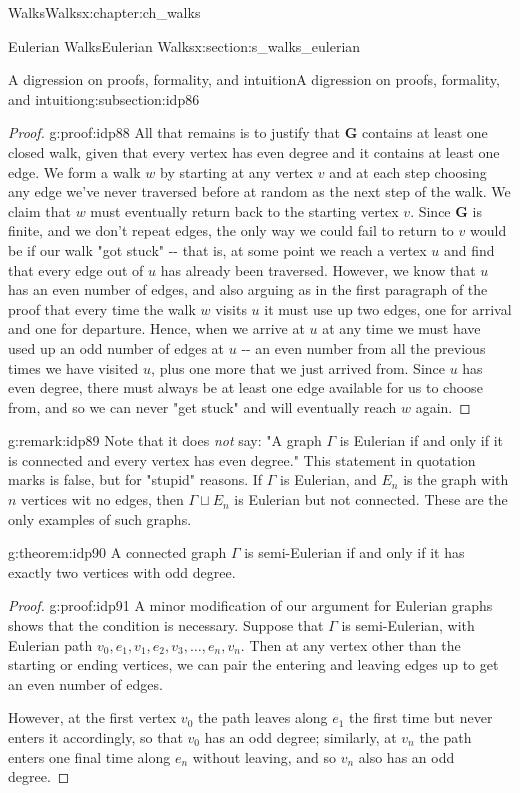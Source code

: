 \documentclass[oneside,10pt,]{book}
\numberwithin{equation}{section}
\newcommand{\bfG}{\mathbf{G}}
\begin{document}
\begin{chapterptx}{Walks}{}{Walks}{}{}{x:chapter:ch_walks}
\begin{sectionptx}{Eulerian Walks}{}{Eulerian Walks}{}{}{x:section:s_walks_eulerian}
\begin{subsectionptx}{A digression on proofs, formality, and intuition}{}{A digression on proofs, formality, and intuition}{}{}{g:subsection:idp86}
\begin{proof}{}{g:proof:idp88}
All that remains is to justify that \(\bfG\) contains at least one closed walk, given that every vertex has even degree and it contains at least one edge.  We form a walk \(w\) by starting at any vertex \(v\) and at each step choosing any edge we've never traversed before at random as the next step of the walk.  We claim that \(w\) must eventually return back to the starting vertex \(v\).  Since \(\bfG\) is finite, and we don't repeat edges, the only way we could fail to return to \(v\) would be if our walk "got stuck" -{}-{} that is, at some point we reach a vertex \(u\) and find that every edge out of \(u\) has already been traversed.  However, we know that \(u\) has an even number of edges, and also arguing as in the first paragraph of the proof that every time the walk \(w\) visits \(u\) it must use up two edges, one for arrival and one for departure.  Hence, when we arrive at \(u\) at any time we must have used up an odd number of edges at \(u\) -{}-{} an even number from all the previous times we have visited \(u\), plus one more that we just arrived from.  Since \(u\) has even degree, there must always be at least one edge available for us to choose from, and so we can never "get stuck" and will eventually reach \(w\) again.%
\end{proof}
\begin{remark}{}{g:remark:idp89}%
Note that it does \emph{not} say: "A graph \(\Gamma\) is Eulerian if and only if it is connected and every vertex has even degree." This statement in quotation marks is false, but for "stupid" reasons.  If \(\Gamma\) is Eulerian, and \(E_n\) is the graph with \(n\) vertices wit no edges, then \(\Gamma\sqcup E_n\) is Eulerian but not connected.  These are the only examples of such graphs.%
\end{remark}
\begin{theorem}{}{}{g:theorem:idp90}%
A connected graph \(\Gamma\) is semi-Eulerian if and only if it has exactly two vertices with odd degree.%
\end{theorem}
\begin{proof}{}{g:proof:idp91}
A minor modification of our argument for Eulerian graphs shows that the condition is necessary.  Suppose that \(\Gamma\) is semi-Eulerian, with Eulerian path \(v_0, e_1, v_1,e_2,v_3,\dots,e_n,v_n\).  Then at any vertex other than the starting or ending vertices, we can pair the entering and leaving edges up to get an even number of edges.%
\par
However, at the first vertex \(v_0\) the path leaves along \(e_1\) the first time but never enters it accordingly, so that \(v_0\) has an odd degree; similarly, at \(v_n\) the path enters one final time along \(e_n\) without leaving, and so \(v_n\) also has an odd degree.%

\end{proof}
\end{subsectionptx}
\end{sectionptx}
\end{chapterptx}
\end{document}
